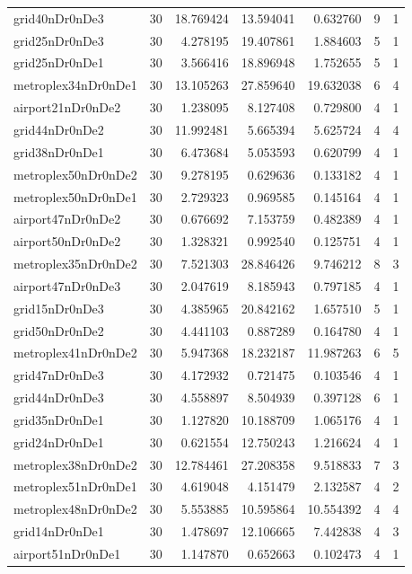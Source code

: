 \begin{longtable}{|l|r|r|r|r|r|r|}
grid40nDr0nDe3 & 30 & 18.769424 & 13.594041 & 0.632760 & 9 & 1 \\
grid25nDr0nDe3 & 30 & 4.278195 & 19.407861 & 1.884603 & 5 & 1 \\
grid25nDr0nDe1 & 30 & 3.566416 & 18.896948 & 1.752655 & 5 & 1 \\
metroplex34nDr0nDe1 & 30 & 13.105263 & 27.859640 & 19.632038 & 6 & 4 \\
airport21nDr0nDe2 & 30 & 1.238095 & 8.127408 & 0.729800 & 4 & 1 \\
grid44nDr0nDe2 & 30 & 11.992481 & 5.665394 & 5.625724 & 4 & 4 \\
grid38nDr0nDe1 & 30 & 6.473684 & 5.053593 & 0.620799 & 4 & 1 \\
metroplex50nDr0nDe2 & 30 & 9.278195 & 0.629636 & 0.133182 & 4 & 1 \\
metroplex50nDr0nDe1 & 30 & 2.729323 & 0.969585 & 0.145164 & 4 & 1 \\
airport47nDr0nDe2 & 30 & 0.676692 & 7.153759 & 0.482389 & 4 & 1 \\
airport50nDr0nDe2 & 30 & 1.328321 & 0.992540 & 0.125751 & 4 & 1 \\
metroplex35nDr0nDe2 & 30 & 7.521303 & 28.846426 & 9.746212 & 8 & 3 \\
airport47nDr0nDe3 & 30 & 2.047619 & 8.185943 & 0.797185 & 4 & 1 \\
grid15nDr0nDe3 & 30 & 4.385965 & 20.842162 & 1.657510 & 5 & 1 \\
grid50nDr0nDe2 & 30 & 4.441103 & 0.887289 & 0.164780 & 4 & 1 \\
metroplex41nDr0nDe2 & 30 & 5.947368 & 18.232187 & 11.987263 & 6 & 5 \\
grid47nDr0nDe3 & 30 & 4.172932 & 0.721475 & 0.103546 & 4 & 1 \\
grid44nDr0nDe3 & 30 & 4.558897 & 8.504939 & 0.397128 & 6 & 1 \\
grid35nDr0nDe1 & 30 & 1.127820 & 10.188709 & 1.065176 & 4 & 1 \\
grid24nDr0nDe1 & 30 & 0.621554 & 12.750243 & 1.216624 & 4 & 1 \\
metroplex38nDr0nDe2 & 30 & 12.784461 & 27.208358 & 9.518833 & 7 & 3 \\
metroplex51nDr0nDe1 & 30 & 4.619048 & 4.151479 & 2.132587 & 4 & 2 \\
metroplex48nDr0nDe2 & 30 & 5.553885 & 10.595864 & 10.554392 & 4 & 4 \\
grid14nDr0nDe1 & 30 & 1.478697 & 12.106665 & 7.442838 & 4 & 3 \\
airport51nDr0nDe1 & 30 & 1.147870 & 0.652663 & 0.102473 & 4 & 1 \\

\end{longtable}

